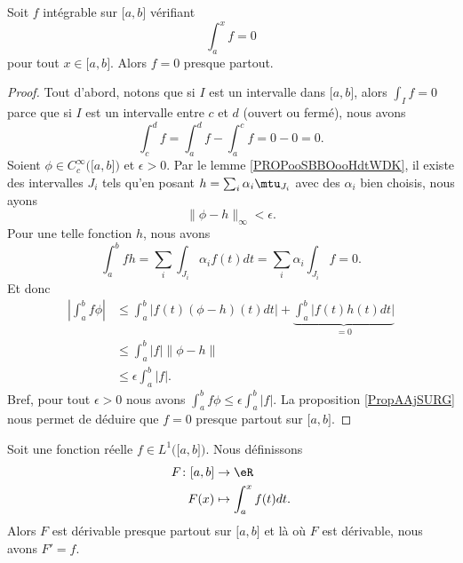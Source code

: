 \begin{proposition}	\label{PROPooZOJHooKwZOFW}
	Soit \( f\) intégrable sur \( \mathopen[ a,b\mathclose]\) vérifiant
	\begin{equation}
		\int_a^xf=0
	\end{equation}
	pour tout \( x\in\mathopen[ a,b\mathclose]\). Alors \( f=0\) presque partout.
\end{proposition}

\begin{proof}
	Tout d'abord, notons que si \( I\) est un intervalle dans \( \mathopen[ a,b\mathclose]\), alors \( \int_If=0\) parce que si \( I\) est un intervalle entre \( c\) et \( d\) (ouvert ou fermé), nous avons
	\begin{equation}
		\int_{c}^df=\int_a^df-\int_a^cf=0-0=0.
	\end{equation}
	Soient \( \phi\in C^{\infty}_c\big( \mathopen[ a,b\mathclose] \big)\) et \( \epsilon>0\). Par le lemme \ref{PROPooSBBOooHdtWDK}, il existe des intervalles \( J_i\) tels qu'en posant \( h=\sum_i\alpha_i\mtu_{J_i}\) avec des \( \alpha_i\) bien choisis, nous ayons
	\begin{equation}
		\| \phi-h \|_{\infty}<\epsilon.
	\end{equation}
	Pour une telle fonction \( h\), nous avons
	\begin{equation}
		\int_a^bfh=\sum_i\int_{J_i}\alpha_if(t)dt=\sum_i\alpha_i\int_{J_i}f=0.
	\end{equation}
	Et donc
	\begin{subequations}
		\begin{align}
			| \int_a^bf\phi | & \leq \int_a^b| f(t)(\phi-h)(t)dt |+\underbrace{\int_a^b| f(t)h(t)dt |}_{=0} \\
			                  & \leq\int_a^b|f|\| \phi-h \|                                                 \\
			                  & \leq \epsilon\int_a^b|f|.
		\end{align}
	\end{subequations}
	Bref, pour tout \( \epsilon>0\) nous avons \( \int_a^bf\phi\leq \epsilon\int_a^b| f |\). La proposition \ref{PropAAjSURG} nous permet de déduire que \( f=0\) presque partout sur \( \mathopen[ a,b\mathclose]\).
\end{proof}


\begin{proposition}	\label{PROPooUMIPooQGXaPd}
	Soit une fonction réelle \(  f\in L^1\big( \mathopen[ a,b\mathclose]\big)\). Nous définissons
	\begin{equation}
		\begin{aligned}
			F\colon \mathopen[ a,b\mathclose] & \to \eR                 \\
			F(x)                              & \mapsto \int_a^xf(t)dt.
		\end{aligned}
	\end{equation}
	Alors \( F\) est dérivable presque partout sur \( \mathopen[ a,b\mathclose]\) et là où \( F\) est dérivable, nous avons \( F'=f\).
\end{proposition}


